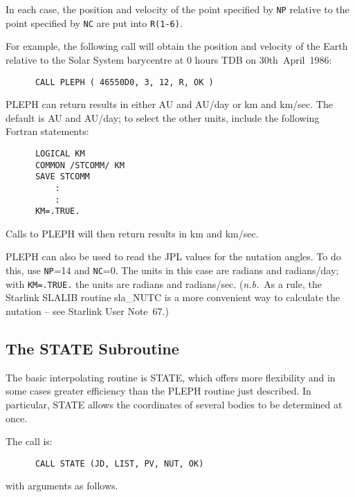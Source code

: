 In each case, the position and velocity of the point
specified by \verb|NP| relative to
the point specified by \verb|NC| are put into \verb|R(1-6)|.

For example, the following call will obtain the position and velocity of the
Earth relative to the Solar System barycentre at 0 hours TDB on
30th~April~1986:
\begin{verbatim}
      CALL PLEPH ( 46550D0, 3, 12, R, OK )
\end{verbatim}

PLEPH can return results in either AU and AU/day or km and km/sec.
The default is AU and AU/day; to select the other units, include the following
Fortran statements:
\begin{verbatim}
      LOGICAL KM
      COMMON /STCOMM/ KM
      SAVE STCOMM
          :
          :
      KM=.TRUE.
\end{verbatim}
Calls to PLEPH will then return results in km and km/sec.

PLEPH can also be used to read the JPL values for the nutation angles.
To do this, use \verb|NP|=14 and \verb|NC|=0.  The units in this case are
radians and radians/day;  with \verb|KM=.TRUE.| the units
are radians and radians/sec.  ({\it n.b.}\ As a rule,
the Starlink SLALIB routine sla\_NUTC is a
more convenient way to calculate the nutation -- see Starlink User
Note~67.)

\subsection{The STATE Subroutine}
The basic interpolating routine is STATE, which offers more
flexibility and in some cases
greater efficiency than the PLEPH routine just described.
In particular, STATE allows the coordinates of several bodies to be
determined at once.

The call is:
\begin{verbatim}
      CALL STATE (JD, LIST, PV, NUT, OK)
\end{verbatim}
with arguments as follows.

